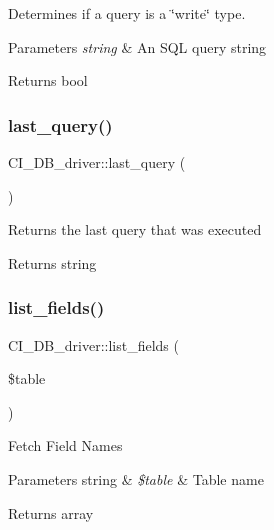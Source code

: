 Determines if a query is a \char`\"{}write\char`\"{} type.


\begin{DoxyParams}{Parameters}
{\em string} & An S\+QL query string \\
\hline
\end{DoxyParams}
\begin{DoxyReturn}{Returns}
bool 
\end{DoxyReturn}
\mbox{\label{class_c_i___d_b__driver_ae213398b1e7b273897c7640966d4ebe8}} 
\subsubsection{\texorpdfstring{last\+\_\+query()}{last\_query()}}
{\footnotesize\ttfamily C\+I\+\_\+\+D\+B\+\_\+driver\+::last\+\_\+query (\begin{DoxyParamCaption}{ }\end{DoxyParamCaption})}

Returns the last query that was executed

\begin{DoxyReturn}{Returns}
string 
\end{DoxyReturn}
\mbox{\label{class_c_i___d_b__driver_abfedb79091a4392eb4246bb944c7ce41}} 
\subsubsection{\texorpdfstring{list\+\_\+fields()}{list\_fields()}}
{\footnotesize\ttfamily C\+I\+\_\+\+D\+B\+\_\+driver\+::list\+\_\+fields (\begin{DoxyParamCaption}\item[{}]{\$table }\end{DoxyParamCaption})}

Fetch Field Names


\begin{DoxyParams}[1]{Parameters}
string & {\em \$table} & Table name \\
\hline
\end{DoxyParams}
\begin{DoxyReturn}{Returns}
array 
\end{DoxyReturn}
\mbox{\label{class_c_i___d_b__driver_a8fc74649a5014331e5222913ba65a89e}} 
